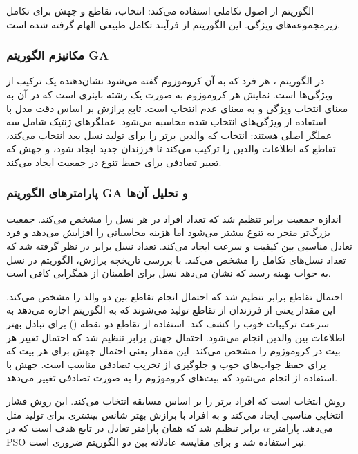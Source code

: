 \documentclass{article}
\begin{document}
الگوریتم  از اصول تکاملی استفاده می‌کند: انتخاب، تقاطع و جهش برای تکامل زیرمجموعه‌های ویژگی. این الگوریتم از فرآیند تکامل طبیعی الهام گرفته شده است.

\subsubsection{مکانیزم الگوریتم GA}

در الگوریتم ، هر فرد که به آن کروموزوم گفته می‌شود نشان‌دهنده یک ترکیب از ویژگی‌ها است. نمایش هر کروموزوم به صورت یک رشته باینری است که در آن  به معنای انتخاب ویژگی و  به معنای عدم انتخاب است. تابع برازش بر اساس دقت مدل با استفاده از ویژگی‌های انتخاب شده محاسبه می‌شود. عملگرهای ژنتیک شامل سه عملگر اصلی هستند: انتخاب که والدین برتر را برای تولید نسل بعد انتخاب می‌کند، تقاطع که اطلاعات والدین را ترکیب می‌کند تا فرزندان جدید ایجاد شود، و جهش که تغییر تصادفی برای حفظ تنوع در جمعیت ایجاد می‌کند.

\subsubsection{پارامترهای الگوریتم GA و تحلیل آن‌ها}

اندازه جمعیت برابر  تنظیم شد که تعداد افراد در هر نسل را مشخص می‌کند. جمعیت بزرگ‌تر منجر به تنوع بیشتر می‌شود اما هزینه محاسباتی را افزایش می‌دهد و  فرد تعادل مناسبی بین کیفیت و سرعت ایجاد می‌کند. تعداد نسل برابر  در نظر گرفته شد که تعداد نسل‌های تکامل را مشخص می‌کند. با بررسی تاریخچه برازش، الگوریتم در نسل  به جواب بهینه رسید که نشان می‌دهد  نسل برای اطمینان از همگرایی کافی است.

احتمال تقاطع برابر  تنظیم شد که احتمال انجام تقاطع بین دو والد را مشخص می‌کند. این مقدار یعنی  از فرزندان از تقاطع تولید می‌شوند که به الگوریتم اجازه می‌دهد به سرعت ترکیبات خوب را کشف کند. استفاده از تقاطع دو نقطه () برای تبادل بهتر اطلاعات بین والدین انجام می‌شود. احتمال جهش برابر  تنظیم شد که احتمال تغییر هر بیت در کروموزوم را مشخص می‌کند. این مقدار یعنی  احتمال جهش برای هر بیت که برای حفظ جواب‌های خوب و جلوگیری از تخریب تصادفی مناسب است. جهش با استفاده از  انجام می‌شود که بیت‌های کروموزوم را به صورت تصادفی تغییر می‌دهد.

روش انتخاب  است که افراد برتر را بر اساس مسابقه انتخاب می‌کند. این روش فشار انتخابی مناسبی ایجاد می‌کند و به افراد با برازش بهتر شانس بیشتری برای تولید مثل می‌دهد. پارامتر $\alpha$ برابر  تنظیم شد که همان پارامتر تعادل در تابع هدف است که در PSO نیز استفاده شد و برای مقایسه عادلانه بین دو الگوریتم ضروری است.
\end{document}
